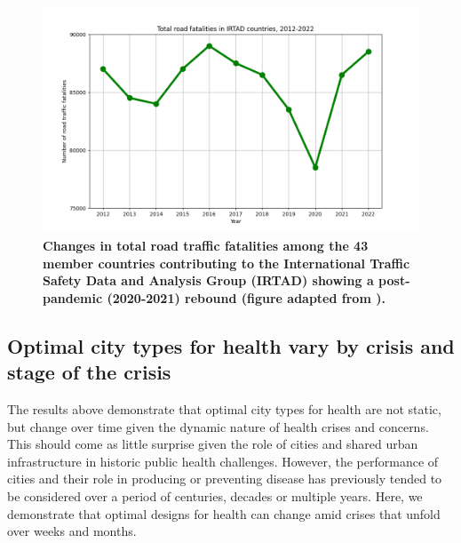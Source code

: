 \documentclass[preprint,10pt]{elsarticle} %
\begin{document}
\begin{figure}
\centering

\includegraphics[trim={0 0 0 0},clip,scale=0.5]{Images/Recreated.png}
\caption{\bf Changes in total road traffic fatalities among the 43 member countries contributing to the International Traffic Safety Data and Analysis Group (IRTAD) showing a post-pandemic (2020-2021) rebound (figure adapted from \cite{ITFRS2023}).}  
 \label{fig:GBD}
\end{figure}



\subsection*{Optimal city types for health vary by crisis and stage of the crisis}

The results above demonstrate that optimal city types for health are not static, but change over time given the dynamic nature of health crises and concerns. This should come as little surprise given the role of cities and shared urban infrastructure in historic public health challenges. However, the performance of cities and their role in producing or preventing disease has previously tended to be considered over a period of centuries, decades or multiple years. Here, we demonstrate that optimal designs for health can change amid crises that unfold over weeks and months.
\end{document}
